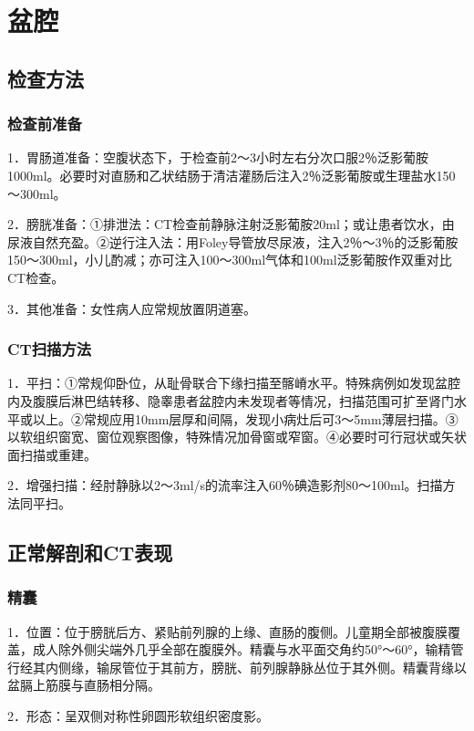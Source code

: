 \chapter{盆腔}

\section{检查方法}

\subsection{检查前准备}

1．胃肠道准备：空腹状态下，于检查前2～3小时左右分次口服2％泛影葡胺1000ml。必要时对直肠和乙状结肠于清洁灌肠后注入2％泛影葡胺或生理盐水150～300ml。

2．膀胱准备：①排泄法：CT检查前静脉注射泛影葡胺20ml；或让患者饮水，由尿液自然充盈。②逆行注入法：用Foley导管放尽尿液，注入2％～3％的泛影葡胺150～300ml，小儿酌减；亦可注入100～300ml气体和100ml泛影葡胺作双重对比CT检查。

3．其他准备：女性病人应常规放置阴道塞。

\subsection{CT扫描方法}

1．平扫：①常规仰卧位，从耻骨联合下缘扫描至髂嵴水平。特殊病例如发现盆腔内及腹膜后淋巴结转移、隐睾患者盆腔内未发现者等情况，扫描范围可扩至肾门水平或以上。②常规应用10mm层厚和间隔，发现小病灶后可3～5mm薄层扫描。③以软组织窗宽、窗位观察图像，特殊情况加骨窗或窄窗。④必要时可行冠状或矢状面扫描或重建。

2．增强扫描：经肘静脉以2～3ml/s的流率注入60％碘造影剂80～100ml。扫描方法同平扫。

\section{正常解剖和CT表现}

\subsection{精囊}

1．位置：位于膀胱后方、紧贴前列腺的上缘、直肠的腹侧。儿童期全部被腹膜覆盖，成人除外侧尖端外几乎全部在腹膜外。精囊与水平面交角约50°～60°，输精管行经其内侧缘，输尿管位于其前方，膀胱、前列腺静脉丛位于其外侧。精囊背缘以盆膈上筋膜与直肠相分隔。

2．形态：呈双侧对称性卵圆形软组织密度影。

